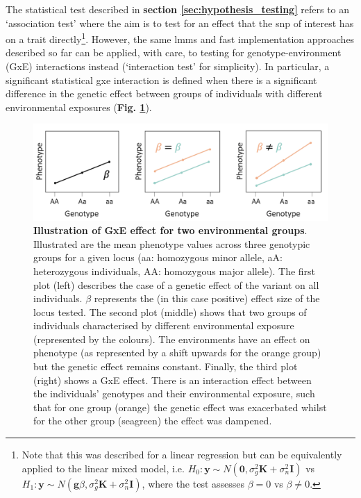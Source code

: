 The  statistical test described in \textbf{section \ref{sec:hypothesis_testing}} refers to an `association test' where the aim is to test for an effect that the \gls{snp} of interest has on a trait directly\footnote{Note that this was described for a linear regression but can be equivalently applied to the linear mixed model, i.e. $H_0: \mathbf{y} \sim N (\mathbf{0}, \sigma_g^2\mathbf{K} + \sigma_n^2\mathbf{I})$ vs $H_1: \mathbf{y} \sim N (\mathbf{g}\beta, \sigma_g^2\mathbf{K} + \sigma_n^2\mathbf{I})$, where the test assesses $\beta = 0$ vs $\beta \neq 0$.}.
However, the same \gls{lmm}s and fast implementation approaches described so far can be applied, with care, to testing for genotype-environment (GxE) interactions instead (`interaction test' for simplicity).
In particular, a significant statistical \gls{gxe} interaction is defined when there is a significant difference in the genetic effect between groups of individuals with different environmental exposures (\textbf{Fig. \ref{fig:gxe}}).

\begin{figure}[h]
\centering
\includegraphics[width=15cm]{Chapter1/Fig/GxE.png}
\caption[Illustration of GxE]{\textbf{Illustration of GxE effect for two environmental groups}.\\
Illustrated are the mean phenotype values across three genotypic groups for a given locus (aa: homozygous minor allele, aA: heterozygous individuals, AA: homozygous major allele).
The first plot (left) describes the case of a genetic effect of the variant on all individuals. 
$\beta$ represents the (in this case positive) effect size of the locus tested. 
The second plot (middle) shows that two groups of individuals characterised by different environmental exposure (represented by the colours). 
The environments have an effect on phenotype (as represented by a shift upwards for the orange group) but the genetic effect remains constant. 
Finally, the third plot (right) shows a GxE effect.
There is an interaction effect between the individuals' genotypes and their environmental exposure, such that for one group (orange) the genetic effect was exacerbated whilst for the other group (seagreen) the effect was dampened.}
\label{fig:gxe}
\end{figure}

